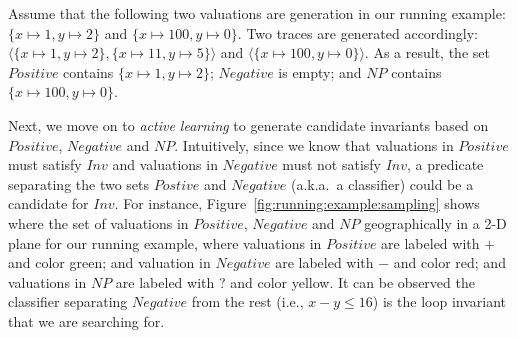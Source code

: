 %
%
\begin{example}
Assume that the following two valuations are generation in our running example: $\{x \mapsto 1, y \mapsto 2\}$ and $\{x \mapsto 100, y \mapsto 0\}$. Two traces are generated accordingly: $\langle \{x \mapsto 1, y \mapsto 2\}, \{x \mapsto 11, y \mapsto 5\} \rangle$ and $\langle \{x \mapsto 100, y \mapsto 0\} \rangle$. As a result, the set $Positive$ contains $\{x \mapsto 1, y \mapsto 2\}$; $Negative$ is empty; and $NP$ contains $\{x \mapsto 100, y \mapsto 0\}$.
\end{example}
Next, we move on to \emph{active learning} to generate candidate invariants based on $Positive$, $Negative$ and $NP$. Intuitively, since we know that valuations in $Positive$ must satisfy $Inv$ and valuations in $Negative$ must not satisfy $Inv$, a predicate separating the two sets $Postive$ and $Negative$ (a.k.a.~a classifier) could be a candidate for $Inv$.
For instance, Figure~\ref{fig:running:example:sampling} shows where the set of valuations in $Positive$, $Negative$ and $NP$ geographically in a 2-D plane for our running example, where valuations in $Positive$ are labeled with $+$ and color green; and valuation in $Negative$ are labeled with $-$ and color red; and valuations in $NP$ are labeled with ? and color yellow. It can be observed the classifier separating $Negative$ from the rest (i.e., $x - y \leq 16$) is the loop invariant that we are searching for.

